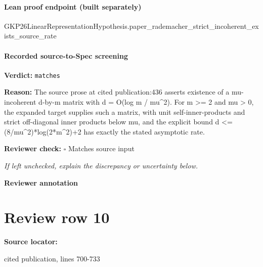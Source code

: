 \documentclass[10pt]{article}
\newcommand{\reviewerbox}{%
  \par\noindent\fbox{\parbox{0.96\linewidth}{\rule{0pt}{0.38in}}}\par
}
\newcommand{\reviewmatch}[1]{%
  \par\noindent\textbf{Reviewer check:} $\square$\; #1\par
  \noindent\emph{If left unchecked, explain the discrepancy or uncertainty below.}\par
}
\begin{document}
\paragraph{Lean proof endpoint (built separately)}\begin{ReviewVerbatim}
GKP26LinearRepresentationHypothesis.paper_rademacher_strict_incoherent_exists_source_rate
\end{ReviewVerbatim}

\paragraph{Recorded source-to-Spec screening}
\textbf{Verdict:} \texttt{matches}
\\
{\raggedright
\textbf{Reason:} The source prose at cited publication:\allowbreak{}436 asserts existence of a mu-\allowbreak{}incoherent d-\allowbreak{}by-\allowbreak{}m matrix with d = O(log m /\allowbreak{} mu\textasciicircum{}2).\allowbreak{} For m >= 2 and mu > 0, the expanded target supplies such a matrix, with unit self-\allowbreak{}inner-\allowbreak{}products and strict off-\allowbreak{}diagonal inner products below mu, and the explicit bound d <= (8/\allowbreak{}mu\textasciicircum{}2)*log(2*m\textasciicircum{}2)+2 has exactly the stated asymptotic rate.\allowbreak{}
\par}
\reviewmatch{Matches source input}
\noindent\textbf{Reviewer annotation}\par
\reviewerbox
\clearpage
\hypertarget{source-claim-b1fd683d79993219}{}
\section*{Review row 10}
\textbf{Source locator:} {\footnotesize\raggedright cited publication, lines 700-\allowbreak{}733\par}
\end{document}
